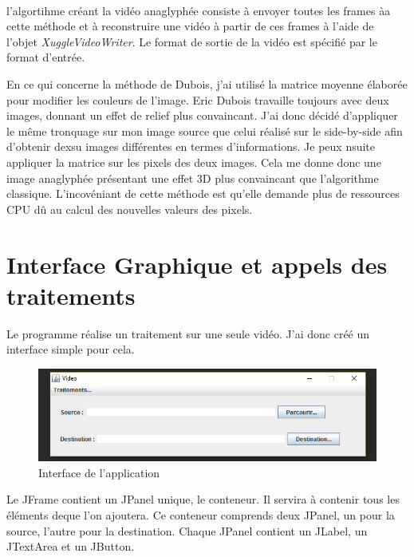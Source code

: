 \documentclass[10pt,a4paper]{article}
\begin{document}

~~\\

l'algortihme créant la vidéo anaglyphée consiste à envoyer toutes les frames àa cette méthode et à reconstruire une vidéo à partir de ces frames à l'aide de l'objet
\textit{XuggleVideoWriter}. Le format de sortie de la vidéo est spécifié par le format d'entrée.

En ce qui concerne la méthode de Dubois, j'ai utilisé la matrice moyenne élaborée pour modifier les couleurs de l'image. Eric Dubois travaille toujours avec deux images, donnant un effet de relief plus
convaincant. J'ai donc décidé d'appliquer le même tronquage sur mon image source que celui réalisé sur le side-by-side afin d'obtenir dexsu images différentes en termes d'informations. Je peux nsuite
appliquer la matrice sur les pixels des deux images. Cela me donne donc une image anaglyphée présentant une effet 3D plus convaincant que l'algorithme classique. L'incovéniant de cette méthode est
qu'elle demande plus de ressources CPU dû au calcul des nouvelles valeurs des pixels.


\section{Interface Graphique et appels des traitements}

Le programme réalise un traitement sur une seule vidéo. J'ai donc créé un interface simple pour cela.

\begin{figure}[!h]
\center
\includegraphics[scale = 0.8]{interface.PNG}
\caption{Interface de l'application}
\end{figure}

Le JFrame contient un JPanel unique, le conteneur. Il servira à contenir tous les éléments deque l'on ajoutera. Ce conteneur comprends deux JPanel, un pour la source, l'autre pour la destination.
Chaque JPanel contient un JLabel, un JTextArea et un JButton.
\end{document}
